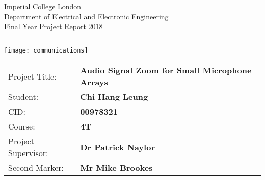 \begin{titlepage}
                \setlength{\parindent}{0pt}
                \setlength{\parskip}{0pt}

                {
                                \Large
                                \raggedright
                                Imperial College London\\[17pt]
                                Department of Electrical and Electronic Engineering\\[17pt]
                                Final Year Project Report 2018\\[17pt]
 
                }

                \rule{\columnwidth}{3pt}
                \vfill
                \centering
                  \texttt{[image: communications]}
                \vfill
                \setlength{\tabcolsep}{0pt}

                \begin{tabular}{p{40mm}p{\dimexpr\columnwidth-40mm}}
                                Project Title: & \textbf{Audio Signal Zoom for Small Microphone Arrays} \\[12pt]
                                Student: & \textbf{Chi Hang Leung} \\[12pt]
                                CID: & \textbf{00978321} \\[12pt]
                                Course: & \textbf{4T} \\[12pt]
                                Project Supervisor: & \textbf{Dr Patrick Naylor} \\[12pt]
                                Second Marker: & \textbf{Mr Mike Brookes} \\
                \end{tabular}
\end{titlepage}